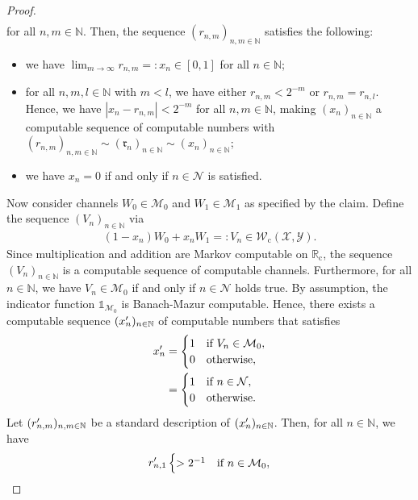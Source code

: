 \documentclass[conference]{IEEEtran}
\def\X{{\mathcal X}}
\def\Y{{\mathcal Y}}
\def\M{{\mathcal M}}
\def\N{{\mathcal N}}
\def\W{{\mathcal W}}
\def\NN{{\mathbb N}}
\def\RR{{\mathbb R}}
\newcommand{\RRc}{\RR_{\mathrm{c}}}
\newcommand{\xp}[1]{\mathrlap{\phantom{x}^{\prime}}x_{#1}}
\newcommand{\rp}[1]{\mathrlap{\phantom{r}^{\prime}}r_{#1}}
\newcommand{\Wc}{\W_{\mathrm{c}}}
\begin{document}
\begin{proof}
\begin{align}
					\end{align}
					for all \(n,m\in\NN\). Then, the sequence \((r_{n,m})_{n,m\in\NN}\) satisfies the following:
					\begin{itemize}	\item	we have \(\lim_{m\to\infty} r_{n,m} =: x_n \in [0,1]\) for all \(n\in \NN\);
									\item	for all \(n,m,l\in\NN\) with \(m < l\), we have either \(r_{n,m} < 2^{-m}\) or   
											\(r_{n,m} = r_{n,l}\). Hence, we have \(|x_n - r_{n,m}| < 2^{-m}\) for all \(n,m\in\NN\),
											making \((x_n)_{n\in\NN}\) a computable sequence of computable numbers with 
											\((r_{n,m})_{n,m\in\NN} \sim (\mathfrak{r}_{n})_{n\in\NN} \sim (x_n)_{n\in\NN}\);
									\item 	we have \(x_n = 0\) if and only if \(n\in\N\) is satisfied. 
					\end{itemize}   
					Now consider channels \(W_0\in\M_0\) and \(W_1\in\M_1\) as specified by the claim. Define the sequence \((V_n)_{n\in\NN}\) via
					\begin{align}	(1-x_n)W_0 + x_n W_1 =: V_n \in \Wc(\X,\Y).
					\end{align}
					Since multiplication and addition are Markov computable on \(\RRc\), the sequence \((V_n)_{n\in\NN}\) is a computable
					sequence of computable channels. Furthermore, for all \(n\in\NN\), we have \(V_n \in \M_0\) if and only if \(n\in\N\) holds true. 
					By assumption, the indicator function \(\mathds{1}_{\M_0}\) is Banach-Mazur computable. Hence, there exists a computable sequence
					\((\xp{n})_{n\in\NN}\) of computable numbers that satisfies
					\begin{align}	\xp{n}	&= 	\begin{cases}	1	&\text{if}~ V_n \in \M_0, \\
																0 	&\text{otherwise},
												\end{cases} \\
											&=	\begin{cases}	1	&\text{if}~ n \in \N, \\
																0 	&\text{otherwise}.
												\end{cases} 
					\end{align}
					Let \((\rp{n,m})_{n,m\in\NN}\) be a standard description of \((\xp{n})_{n\in\NN}\). Then, for all \(n\in\NN\), we have
					\begin{align}	\rp{n,1} 	\begin{cases}	> 2^{-1}	&\text{if}~ n \in \M_0, \\

\end{cases}
\end{align}
\end{proof}
\end{document}
